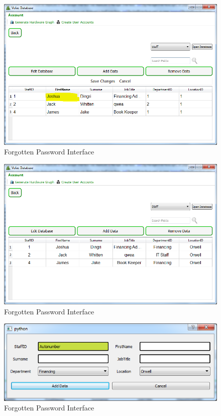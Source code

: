 \begin{figure}[H]
    \includegraphics[width=\textwidth]{./Testing/Images/EditDataBtn.png}
    \caption{Forgotten Password Interface} \label{fig:EditDataBtn}
\end{figure}

\begin{figure}[H]
    \includegraphics[width=\textwidth]{./Testing/Images/SaveChanges.png}
    \caption{Forgotten Password Interface} \label{fig:SaveChanges}
\end{figure}

\begin{figure}[H]
    \includegraphics[width=\textwidth]{./Testing/Images/AddDataWindow.png}
    \caption{Forgotten Password Interface} \label{fig:AddDataWindow}
\end{figure}

